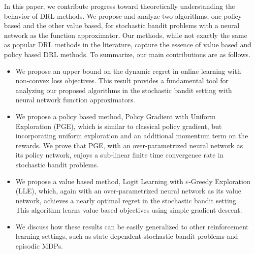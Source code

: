 In this paper, we contribute progress toward theoretically understanding the behavior of DRL methods. 
We propose and analyze two algorithms, one policy based and the other value based, for stochastic bandit problems with a neural network as the function approximator. Our methods, while not exactly the same as popular DRL methods in the literature, capture the essence of value based and policy based DRL methods. To summarize, our main contributions are as follows.
\begin{itemize}
       \item We propose an upper bound on the dynamic regret in online learning with non-convex loss objectives. This result provides a fundamental tool for analyzing our proposed algorithms in the stochastic bandit setting with neural network function approximators. 
	\item We propose a policy based method, Policy Gradient with Uniform Exploration (PGE), which is similar to classical policy gradient, but incorporating uniform exploration and an additional momentum term on the rewards. We prove that PGE, with an over-parametrized neural network as its policy network, enjoys a sub-linear finite time convergence rate in stochastic bandit problems.
	\item We propose a value based method, Logit Learning with $\varepsilon$-Greedy Exploration (LLE), which, again with an over-parametrized neural network as its value network, achieves a nearly optimal regret in the stochastic bandit setting. This algorithm learns value based objectives using simple gradient descent. 
	\item We discuss how these results can be easily generalized to other reinforcement learning settings, such as state dependent stochastic bandit problems and episodic MDPs.
\end{itemize}
\iffalse
To our best knowledge, this paper is the first result in the literature on the optimization theory of RL methods with neural networks as function approximations. Our results can be seen as an initial step toward understanding the globally convergence for the popular RL methods (the value based learning, and the policy gradient here) with non-linear neural network function approximations, such as Deep Q-Network \cite{mnih2015human}, Asynchronous Actor-Critic Agents \citep{mnih2016asynchronous}, Path Consistency Learning \citep{nachum2017bridging}, and Relative Entropy Policy Search \citep{peters2010relative}, combining with more practical function approximations and training procedures.
\fi
